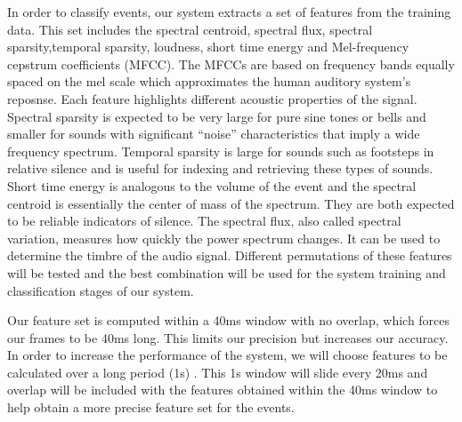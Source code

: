 In order to classify events, our system extracts a set of features from the training data. This set includes the spectral centroid, spectral flux, spectral sparsity,temporal sparsity, loudness, short time energy and Mel-frequency cepstrum coefficients (MFCC). The MFCCs are based on frequency bands equally spaced on the mel scale which approximates the human auditory system's reposnse.  
Each feature highlights different acoustic properties of the signal. Spectral sparsity is expected to be very large for pure sine tones or bells and smaller for sounds with significant ``noise'' characteristics that imply a wide frequency spectrum. Temporal sparsity is large for sounds such as footsteps in relative silence and is useful for indexing and retrieving these types of sounds. Short time energy  is analogous to the volume of the event and the spectral centroid is essentially the center of mass of the spectrum. They are both expected to be reliable indicators of silence. The spectral flux, also called spectral variation, measures how quickly the power spectrum changes. It can be used to determine the timbre of the audio signal. Different permutations of these features will be tested and the best combination will be used for the system training and classification stages of our system. 

Our feature set is computed within a 40ms window with no overlap, which forces our frames to be 40ms long. This limits our precision but increases our accuracy. In order to increase the performance of the system, we will choose features to be calculated over a long period (1s) . This 1s window will slide every 20ms and overlap will be included with the features obtained within the 40ms window to help obtain a more precise feature set for the events. 
